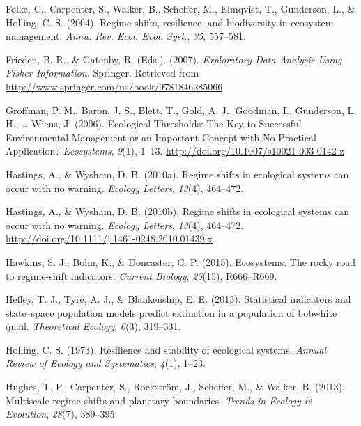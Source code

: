 \documentclass[12pt,twoside,openany]{reedthesis}
\begin{document}
\leavevmode\hypertarget{ref-folke2004regime}{}%
Folke, C., Carpenter, S., Walker, B., Scheffer, M., Elmqvist, T., Gunderson, L., \& Holling, C. S. (2004). Regime shifts, resilience, and biodiversity in ecosystem management. \emph{Annu. Rev. Ecol. Evol. Syst.}, \emph{35}, 557--581.

\leavevmode\hypertarget{ref-frieden_exploratory_2007}{}%
Frieden, B. R., \& Gatenby, R. (Eds.). (2007). \emph{Exploratory Data Analysis Using Fisher Information}. Springer. Retrieved from \url{http://www.springer.com/us/book/9781846285066}

\leavevmode\hypertarget{ref-groffman_ecological_2006}{}%
Groffman, P. M., Baron, J. S., Blett, T., Gold, A. J., Goodman, I., Gunderson, L. H., \ldots{} Wiens, J. (2006). Ecological Thresholds: The Key to Successful Environmental Management or an Important Concept with No Practical Application? \emph{Ecosystems}, \emph{9}(1), 1--13. \url{http://doi.org/10.1007/s10021-003-0142-z}

\leavevmode\hypertarget{ref-hastings2010regime}{}%
Hastings, A., \& Wysham, D. B. (2010a). Regime shifts in ecological systems can occur with no warning. \emph{Ecology Letters}, \emph{13}(4), 464--472.

\leavevmode\hypertarget{ref-hastings_regime_2010}{}%
Hastings, A., \& Wysham, D. B. (2010b). Regime shifts in ecological systems can occur with no warning. \emph{Ecology Letters}, \emph{13}(4), 464--472. \url{http://doi.org/10.1111/j.1461-0248.2010.01439.x}

\leavevmode\hypertarget{ref-hawkins2015ecosystems}{}%
Hawkins, S. J., Bohn, K., \& Doncaster, C. P. (2015). Ecosystems: The rocky road to regime-shift indicators. \emph{Current Biology}, \emph{25}(15), R666--R669.

\leavevmode\hypertarget{ref-hefley2013statistical}{}%
Hefley, T. J., Tyre, A. J., \& Blankenship, E. E. (2013). Statistical indicators and state--space population models predict extinction in a population of bobwhite quail. \emph{Theoretical Ecology}, \emph{6}(3), 319--331.

\leavevmode\hypertarget{ref-holling1973resilience}{}%
Holling, C. S. (1973). Resilience and stability of ecological systems. \emph{Annual Review of Ecology and Systematics}, \emph{4}(1), 1--23.

\leavevmode\hypertarget{ref-hughes2013multiscale}{}%
Hughes, T. P., Carpenter, S., Rockström, J., Scheffer, M., \& Walker, B. (2013). Multiscale regime shifts and planetary boundaries. \emph{Trends in Ecology \& Evolution}, \emph{28}(7), 389--395.
\end{document}
